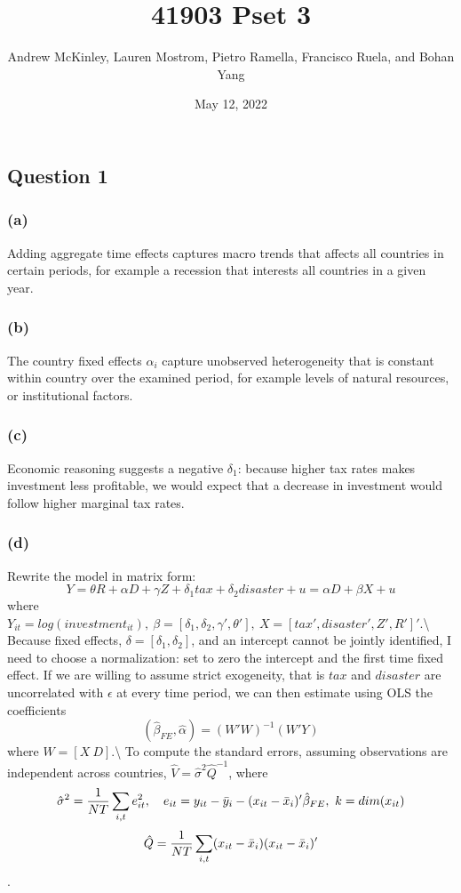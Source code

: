 \documentclass[
]{article}
\title{41903 Pset 3}
\author{Andrew McKinley, Lauren Mostrom, Pietro Ramella, Francisco
Ruela, and Bohan Yang}
\date{May 12, 2022}
\begin{document}
\maketitle

\hypertarget{question-1}{%
\subsection{Question 1}\label{question-1}}

\hypertarget{a}{%
\subsubsection{(a)}\label{a}}

Adding aggregate time effects captures macro trends that affects all
countries in certain periods, for example a recession that interests all
countries in a given year.

\hypertarget{b}{%
\subsubsection{(b)}\label{b}}

The country fixed effects \(\alpha_i\) capture unobserved heterogeneity
that is constant within country over the examined period, for example
levels of natural resources, or institutional factors.

\hypertarget{c}{%
\subsubsection{(c)}\label{c}}

Economic reasoning suggests a negative \(\delta_1\): because higher tax
rates makes investment less profitable, we would expect that a decrease
in investment would follow higher marginal tax rates.

\hypertarget{d}{%
\subsubsection{(d)}\label{d}}

Rewrite the model in matrix form:
\[Y = \theta R + \alpha D + \gamma Z + \delta_1 tax + \delta_2 disaster + u = \alpha D + \beta X + u\]
where
\(Y_{it} = log(investment_{it}),\ \beta = [\delta_1, \delta_2, \gamma', \theta'],\ X = [tax',disaster',Z',R']'\).\textbackslash{}
Because fixed effects, \(\delta = [\delta_1,\delta_2]\), and an
intercept cannot be jointly identified, I need to choose a
normalization: set to zero the intercept and the first time fixed
effect. If we are willing to assume strict exogeneity, that is \(tax\)
and \(disaster\) are uncorrelated with \(\epsilon\) at every time
period, we can then estimate using OLS the coefficients
\[(\hat{\beta}_{FE},\hat{\alpha})=(W'W )^{-1}(W'Y)\] where
\(W=[X\ D]\).\textbackslash{} To compute the standard errors, assuming
observations are independent across countries,
\(\hat{V} = \hat{\sigma}^2\hat{Q}^{-1}\), where
\[\hat{\sigma}^2=\frac{1}{NT}\sum_{i,t}e_{it}^2, \quad e_{it} = y_{it} - \Bar{y}_i - (x_{it} - \Bar{x}_i)'\hat{\beta}_{FE},\ k=dim(x_{it})\]
\[\hat{Q} = \frac{1}{NT}\sum_{i,t} (x_{it} - \Bar{x}_i)(x_{it} - \Bar{x}_i)'\].
\end{document}
